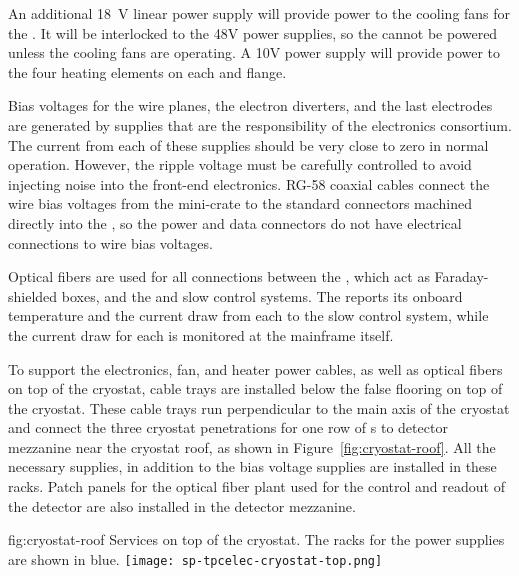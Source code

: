 An additional \SI{18}{V} linear power supply will provide power to the 
cooling fans for the . It will be interlocked to the 48V 
power supplies, so the  cannot be powered unless the cooling 
fans are operating. A \SI{10}{}V power supply will provide power to the four 
heating elements on each  and  flange.

Bias voltages for the  wire planes, the electron diverters, 
and the last  electrodes are generated by supplies that are 
the responsibility of the  electronics consortium.  The 
current from each of these supplies should be very close to zero in 
normal operation. However, the ripple voltage must be carefully 
controlled to avoid injecting noise into the front-end electronics.  
RG-58 coaxial cables connect the wire bias voltages from the mini-crate 
to the standard  connectors machined directly into the 
 \fdth, so the  power and data connectors do not 
have electrical connections to wire bias voltages.

Optical fibers are used for all connections between the , 
which act as Faraday-shielded boxes, and the  and slow 
control systems.  The  reports its onboard temperature 
and the current draw from each  to the slow control system, 
while the current draw for each  is monitored at the 
mainframe itself.

To support the electronics, fan, and heater power cables, as well 
as optical fibers on top of the cryostat, cable trays are installed
below the false flooring on top of the cryostat. These cable trays
run perpendicular to the main axis of the cryostat and connect the
three cryostat penetrations for one row of s to detector
mezzanine near the cryostat roof, as shown in Figure~\ref{fig:cryostat-roof}.
All the necessary  supplies, in addition to the bias
voltage supplies are installed in these racks. Patch panels for
the optical fiber plant used for the control and readout of the
detector are also installed in the detector mezzanine.

\begin{dunefigure}
{fig:cryostat-roof}
{Services on top of the cryostat. The racks for the  power supplies are shown in blue.}
\texttt{[image: sp-tpcelec-cryostat-top.png]}
\end{dunefigure}

